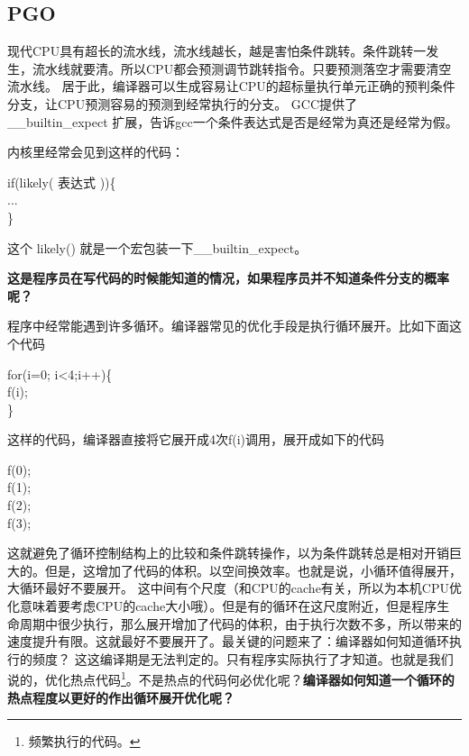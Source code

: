 \subsection{PGO}

现代CPU具有超长的流水线，流水线越长，越是害怕条件跳转。条件跳转一发生，流水线就要清。所以CPU都会预测调节跳转指令。只要预测落空才需要清空流水线。
居于此，编译器可以生成容易让CPU的超标量执行单元正确的预判条件分支，让CPU预测容易的预测到经常执行的分支。
GCC提供了 \_\_builtin\_expect 扩展，告诉gcc一个条件表达式是否是经常为真还是经常为假。

内核里经常会见到这样的代码：

\begin{code}
if(likely( 表达式 ))\{\\
	... \\
\}
\end{code}

这个 likely() 就是一个宏包装一下\_\_builtin\_expect。

\textbf{这是程序员在写代码的时候能知道的情况，如果程序员并不知道条件分支的概率呢？}

程序中经常能遇到许多循环。编译器常见的优化手段是执行循环展开。比如下面这个代码 


\begin{code}
for(i=0; i<4;i++)\{\\
\qquad 	f(i);\\
\}
\end{code}

这样的代码，编译器直接将它展开成4次f(i)调用，展开成如下的代码

\begin{code}
f(0);\\f(1);\\f(2);\\f(3);\\
\end{code}

这就避免了循环控制结构上的比较和条件跳转操作，以为条件跳转总是相对开销巨大的。但是，这增加了代码的体积。以空间换效率。也就是说，小循环值得展开，大循环最好不要展开。
这中间有个尺度（和CPU的cache有关，所以为本机CPU优化意味着要考虑CPU的cache大小哦）。但是有的循环在这尺度附近，但是程序生命周期中很少执行，那么展开增加了代码的体积，由于执行次数不多，所以带来的速度提升有限。这就最好不要展开了。最关键的问题来了：编译器如何知道循环执行的频度？
这这编译期是无法判定的。只有程序实际执行了才知道。也就是我们说的，优化热点代码\footnote{频繁执行的代码。}。不是热点的代码何必优化呢？\textbf{编译器如何知道一个循环的热点程度以更好的作出循环展开优化呢？}

